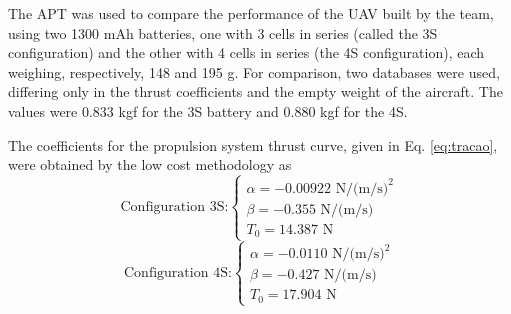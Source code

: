 \documentclass[10pt]{SelfArx} %
\begin{document}
The APT was  used to compare the performance of the UAV built by the team, using two 1300 mAh batteries, one with 3 cells in series (called the 3S configuration) and the other with 4 cells in series (the 4S configuration), each weighing, respectively, 148 and 195 g. For comparison, two databases were used, differing only in the thrust coefficients and the empty weight of the aircraft. The values were 0.833 kgf for the 3S battery and 0.880 kgf for the 4S.

The coefficients for the propulsion system thrust curve,  given in Eq. \ref{eq:tracao}, were obtained by the low cost methodology as
\begin{equation}
\text{Configuration  3S:}
\begin{cases}
\alpha=-0.00922 		\text{ N/(m/s)}^2 \\
\beta=-0.355 		\text{ N/(m/s)} \\
T_0=14.387		\text{ N} 			
\end{cases}
\end{equation}
\begin{equation}
\text{Configuration  4S:}
\begin{cases}
\alpha=-0.0110 		\text{ N/(m/s)}^2 \\
\beta=-0.427 		\text{ N/(m/s)} \\
T_0=17.904 		\text{ N}			
\end{cases}
\end{equation}
\end{document}
